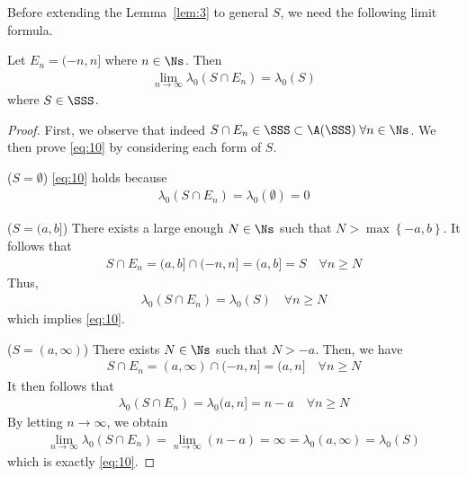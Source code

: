 \documentclass[thmcnt=section, 12pt]{elegantbook}
\begin{document}

\par Before extending the Lemma~\ref{lem:3} to general $S$, we need the following limit formula.

\begin{lemma} \label{lem:4}
    Let $E_n = (-n, n]$ where $n \in \Ns$. Then 
    \begin{align}
        \lim_{n \to \infty} \lambda_0 (S \cap E_n) = \lambda_0(S)
        \label{eq:10}
    \end{align}
    where $S \in \SSS$.
\end{lemma}

\begin{proof}
    First, we observe that indeed $S \cap E_n \in \SSS \subset \A(\SSS) \; \forall n \in \Ns$. We then prove \eqref{eq:10} by considering each form of $S$.

    \par ($S = \emptyset$) \eqref{eq:10} holds because
    \begin{align*}
        \lambda_0(S \cap E_n) = \lambda_0(\emptyset) = 0
    \end{align*}

    \par ($S = (a, b]$) There exists a large enough $N \in \Ns$ such that $N > \max\left\{-a, b\right\}$. It follows that 
    \begin{align*}
        S \cap E_n = (a, b] \cap (-n, n]
        = (a, b]
        = S
        \quad \forall n \geq N
    \end{align*}
    Thus, 
    \begin{align*}
        \lambda_0(S \cap E_n)
        = \lambda_0(S)
        \quad \forall n \geq N
    \end{align*}
    which implies \eqref{eq:10}.

    \par ($S = (a, \infty)$) There exists $N \in \Ns$ such that $N > -a$. Then, we have 
    \begin{align*}
        S \cap E_n
        = (a, \infty) \cap (-n, n]
        = (a, n]
        \quad \forall n \geq N
    \end{align*}
    It then follows that 
    \begin{align*}
        \lambda_0(S \cap E_n)
        = \lambda_0 (a, n]
        = n-a
        \quad \forall n \geq N
    \end{align*}
    By letting $n \to \infty$, we obtain
    \begin{align*}
        \lim_{n\to\infty} \lambda_0(S \cap E_n)
        = \lim_{n\to\infty} (n-a) = \infty
        = \lambda_0 (a, \infty)
        = \lambda_0(S)
    \end{align*}
    which is exactly \eqref{eq:10}.


\end{proof}
\end{document}
